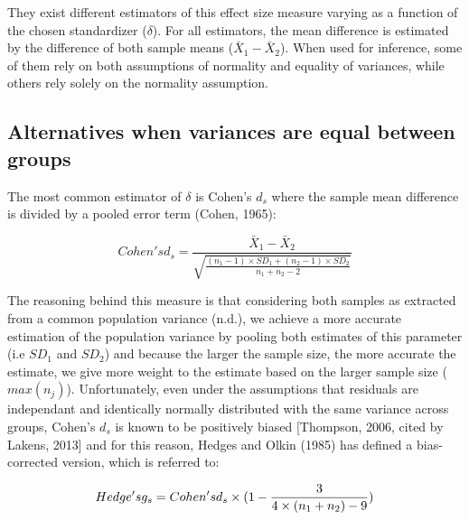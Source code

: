 \documentclass[man]{apa6}
\begin{document}
They exist different estimators of this effect size measure varying as a function of the chosen standardizer (\(\delta\)). For all estimators, the mean difference is estimated by the difference of both sample means (\(\bar{X}_1-\bar{X}_2\)). When used for inference, some of them rely on both assumptions of normality and equality of variances, while others rely solely on the normality assumption.

\hypertarget{alternatives-when-variances-are-equal-between-groups}{%
\subsection{Alternatives when variances are equal between groups}\label{alternatives-when-variances-are-equal-between-groups}}

The most common estimator of \(\delta\) is Cohen's \(d_{s}\) where the sample mean difference is divided by a pooled error term (Cohen, 1965):

\begin{equation} 
Cohen's d_s = \frac{\bar{X}_1-\bar{X}_2}{\sqrt{\frac{(n_1-1) \times SD_1+(n_2-1) \times SD_2}{n_1+n_2-2}}} 
\label{eq:Cohends}
\end{equation}

The reasoning behind this measure is that considering both samples as extracted from a common population variance (n.d.), we achieve a more accurate estimation of the population variance by pooling both estimates of this parameter (i.e \(SD_1\) and \(SD_2\)) and because the larger the sample size, the more accurate the estimate, we give more weight to the estimate based on the larger sample size (\(max(n_j)\)). Unfortunately, even under the assumptions that residuals are independant and identically normally distributed with the same variance across groups, Cohen's \(d_s\) is known to be positively biased {[}Thompson, 2006, cited by Lakens, 2013{]} and for this reason, Hedges and Olkin (1985) has defined a bias-corrected version, which is referred to:

\begin{equation} 
Hedge's \space g_s = Cohen's \space d_s \times (1-\frac{3}{4 \times (n_1+n_2)-9}) 
\label{eq:Hedgesgs}
\end{equation}
\end{document}
